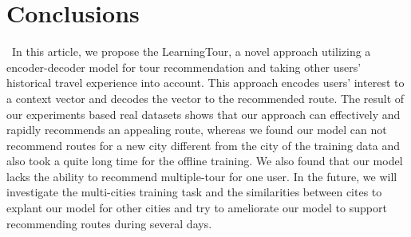 \documentclass[runningheads]{llncs}
\begin{document}
\section{Conclusions}
\quad\, In this article, we propose the LearningTour, a novel approach utilizing a encoder-decoder model for tour recommendation and taking other users' historical travel experience into account. This approach encodes users' interest to a context vector and decodes the vector to the recommended route. The result of our experiments based real datasets shows that our approach can effectively and rapidly recommends an appealing route, whereas we found our model can not recommend routes for a new city different from the city of the training data and also took a quite long time for the offline training. We also found that our model lacks the ability to recommend multiple-tour for one user. In the future, we will investigate the multi-cities training task and the similarities between cites to explant our model for other cities and try to ameliorate our model to support recommending routes during several days.
%
%

%
%
%
% 
% 
%
%
%
%
%
%
%


\end{document}
